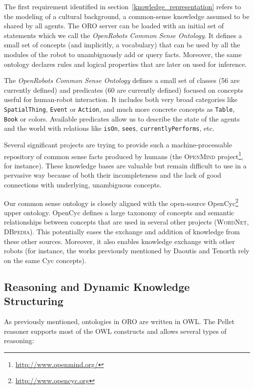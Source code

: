 \documentclass{svmult}
\newcommand{\concept}[1]{{\footnotesize \texttt{#1}}}
\begin{document}
The first requirement identified in section~\ref{knowledge_representation}
refers to the modeling of a cultural background, a common-sense knowledge
assumed to be shared by all agents.
The ORO server can be loaded with an initial set of statements which we call
the \emph{OpenRobots Common Sense Ontology}. It defines a small set of concepts
(and implicitly, a vocabulary) that can be used by all the modules of the robot
to unambiguously add or query facts. Moreover, the same ontology declares rules
and logical properties that are later on used for inference.

The \emph{OpenRobots Common Sense Ontology} defines a small set of classes (56
are currently defined) and predicates (60 are currently defined) focused on
concepts useful for human-robot interaction. It includes both very broad
categories like \concept{SpatialThing}, \concept{Event} or \concept{Action},
and much more concrete concepts as \concept{Table}, \concept{Book} or colors.
Available predicates allow us to describe the state of the agents and the world
with relations like \concept{isOn}, \concept{sees},
\concept{currentlyPerforms}, etc.

Several significant projects are trying to provide such a machine-processable
repository of common sense facts produced by humans (the \textsc{OpenMind}
project\footnote{\url{http://www.openmind.org/}}, for instance). These
knowledge bases are valuable but remain difficult to use in a pervasive way
because of both their incompleteness and the lack of good connections with
underlying, unambiguous concepts.

Our common sense ontology is closely aligned with the open-source
OpenCyc\footnote{\url{http://www.opencyc.org}} upper ontology.
OpenCyc defines a large taxonomy of concepts and semantic
relationships between concepts that are used in several other projects
(\textsc{WordNet, DBpedia}). This potentially eases the exchange and addition
of knowledge from these other sources. Moreover, it also enables knowledge
exchange with other robots (for instance, the works previously mentioned by
Daoutis and Tenorth rely on the same Cyc concepts).

\subsection{Reasoning and Dynamic Knowledge Structuring}

As previously mentioned, ontologies in ORO are written in OWL. The
Pellet reasoner supports most of the OWL constructs and allows several types of
reasoning:
\end{document}
